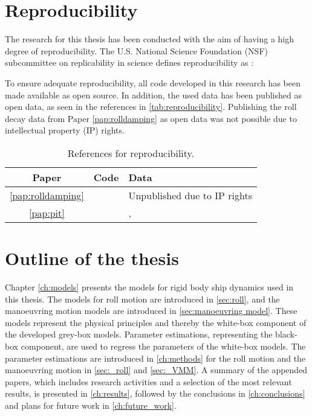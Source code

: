 \section{Reproducibility}
The research for this thesis has been conducted with the aim of having a high degree of reproducibility. The U.S. National Science Foundation (NSF) subcommittee on replicability in science defines reproducibility as \cite{bollenSocialBehavioralEconomic2015}:
\begin{quote}
\vspace{0.2cm}
\vspace{0.2cm}
\end{quote}
To ensure adequate reproducibility, all code developed in this research has been made available as open source. In addition, the used data has been published as open data, as seen in the references in \autoref{tab:reproducibility}. Publishing the roll decay data from Paper \ref{pap:rolldamping} as open data was not possible due to intellectual property (IP) rights.

\begin{table}[H]
    \centering
    \caption{References for reproducibility.}
    \label{tab:reproducibility}
    \begin{tabular}{ c l l}
        \toprule
         Paper &  Code & Data \\
         \hline
         \ref{pap:rolldamping} & \textcite{alexanderssonRolldecayestimators2022} & Unpublished due to IP rights\\
         \ref{pap:pit} & \textcite{alexanderssonCodePaperSystem2022} & \textcite{alexanderssonWPCCManoeuvringModel2022a}, \textcite{sternExperienceSIMMAN20082011} \\
         \bottomrule
    \end{tabular}
\end{table}

\section{Outline of the thesis}
Chapter \ref{ch:models} presents the models for rigid body ship dynamics used in this thesis. The models for roll motion are introduced in \autoref{sec:roll}, and the manoeuvring motion models are introduced in  \autoref{sec:manoeuvring model}. These models represent the physical principles and thereby the white-box component of the developed grey-box models.
Parameter estimations, representing the black-box component, are used to regress the parameters of the white-box models. The parameter estimations are introduced in \autoref{ch:methods} for the roll motion and the manoeuvring motion in \autoref{sec:_roll} and \autoref{sec:_VMM}. 
A summary of the appended papers, which includes research activities and a selection of the most relevant results, is presented in \autoref{ch:results}, followed by the conclusions in \autoref{ch:conclusions} and plans for future work in \autoref{ch:future_work}.